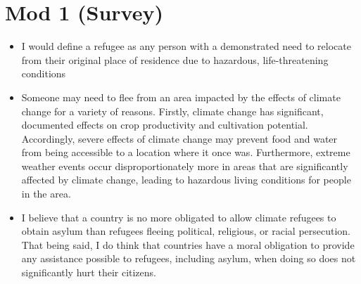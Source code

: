 \documentclass[11pt]{article}
\begin{document}
\section{Mod 1 (Survey)}
\label{sec:org328f0b9}
\begin{itemize}
\item I would define a refugee as any person with a demonstrated need to relocate from their original place of residence due to hazardous, life-threatening conditions
\item Someone may need to flee from an area impacted by the effects of climate change for a variety of reasons. Firstly, climate change has significant, documented effects on crop productivity and cultivation potential. Accordingly, severe effects of climate change may prevent food and water from being accessible to a location where it once was. Furthermore, extreme weather events occur disproportionately more in areas that are significantly affected by climate change, leading to hazardous living conditions for people in the area.
\item I believe that a country is no more obligated to allow climate refugees to obtain asylum than refugees fleeing political, religious, or racial persecution. That being said, I do think that countries have a moral obligation to provide any assistance possible to refugees, including asylum, when doing so does not significantly hurt their citizens.
\end{itemize}
\end{document}
